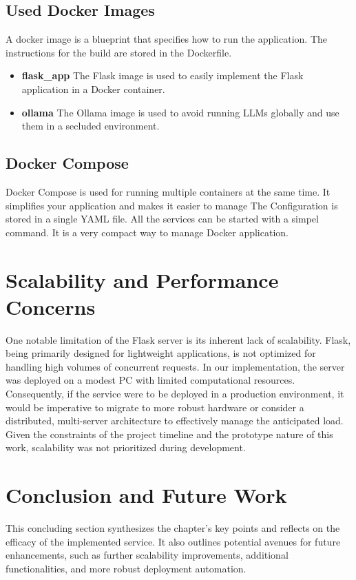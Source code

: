 \subsection{Used Docker Images}
A docker image is a blueprint that specifies how to run the application. The instructions for the build are stored in the Dockerfile.
\cite{dockerize_flask} 

\begin{itemize}
    \item \textbf{flask\_app} The Flask image is used to easily implement the Flask application in a Docker container.
    \item \textbf{ollama} The Ollama image is used to avoid running LLMs globally and use them in a secluded environment.
\end{itemize}

\subsection{Docker Compose}
Docker Compose is used for running multiple containers at the same time. It simplifies your application and makes it easier to manage 
The Configuration is stored in a single YAML file. All the services can be started with a simpel command. It is a very compact way to manage Docker application.
\cite{docker_compose} 

\author{Florian Prandstetter}

\section{Scalability and Performance Concerns}

One notable limitation of the Flask server is its inherent lack of scalability. Flask, being primarily designed for lightweight applications, is not optimized for handling high volumes of concurrent requests. In our implementation, the server was deployed on a modest PC with limited computational resources. Consequently, if the service were to be deployed in a production environment, it would be imperative to migrate to more robust hardware or consider a distributed, multi-server architecture to effectively manage the anticipated load. Given the constraints of the project timeline and the prototype nature of this work, scalability was not prioritized during development.


\section{Conclusion and Future Work}
This concluding section synthesizes the chapter’s key points and reflects on the efficacy of the implemented service. It also outlines potential avenues for future enhancements, such as further scalability improvements, additional functionalities, and more robust deployment automation.





